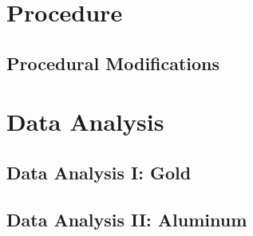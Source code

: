\documentclass[a4paper]{article}
\begin{document}
\begin{figure}[H]
\centering
\label{name}
\end{figure}

\section{Procedure}

\qq

\subsection{Procedural Modifications}

\qq 

\section{Data Analysis}

\subsection{Data Analysis I: Gold}

\qq

\qq 

\qq 

\qq 

\qq 

\subsection{Data Analysis II: Aluminum}

\qq

\qq 
\end{document}
